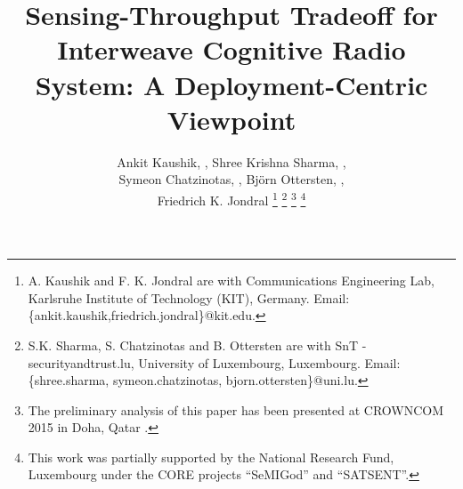 \documentclass[12pt, draftclsnofoot, onecolumn]{IEEEtran}
\begin{document}
%
\title{Sensing-Throughput Tradeoff for Interweave Cognitive Radio System: A Deployment-Centric Viewpoint}
\author{Ankit Kaushik, , Shree Krishna Sharma,  ,\\  Symeon Chatzinotas, , Bj\"orn Ottersten, , \\ Friedrich K. Jondral  
\thanks{A. Kaushik and F. K. Jondral are with Communications Engineering Lab, Karlsruhe Institute of Technology (KIT), Germany. Email:{\{ankit.kaushik,friedrich.jondral\}@kit.edu.}} 
\thanks{S.K. Sharma, S. Chatzinotas and B. Ottersten are with SnT - securityandtrust.lu, University of Luxembourg, Luxembourg. Email:{\{shree.sharma, symeon.chatzinotas, bjorn.ottersten\}@uni.lu}.} 
\thanks{The preliminary analysis of this paper has been presented at CROWNCOM 2015 in Doha, Qatar \cite{Kaushik15_CC}.}
\thanks{This work was partially supported by the National Research Fund, Luxembourg under the CORE projects ``SeMIGod'' and ``SATSENT''.} 
}

\maketitle
\thispagestyle{empty}
\pagestyle{empty}







\end{document}
